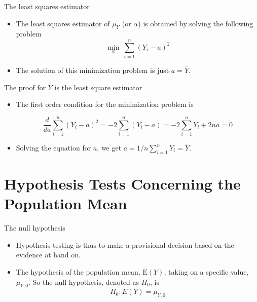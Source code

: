 \documentclass[presentation]{beamer}
\begin{document}
\begin{frame}[label={sec:org7d074b1}]{The least squares estimator}
\begin{itemize}
\item The least squares estimator of \(\mu_Y\) (or \(\alpha\)) is obtained by
solving the following problem
\[ \operatorname*{min}_a\: \sum_{i=1}^n (Y_i - a)^2 \]

\item The solution of this minimization problem is just \(a = \overline{Y}\).
\end{itemize}
\end{frame}

\begin{frame}[label={sec:org93bc69a}]{The proof for \(\overline{Y}\) is the least square estimator}
\begin{itemize}
\item The first order condition for the minimization problem is

\begin{equation*}
  \frac{d}{da}\sum_{i=1}^n (Y_i - a)^2 = -2\sum_{i=1}^n(Y_i - a) = -2\sum_{i=1}^n Y_i+ 2n a = 0      
\end{equation*}

\item Solving the equation for \(a\), we get \(a = 1/n\sum_{i=1}^n Y_i = \overline{Y}\).
\end{itemize}
\end{frame}


\section{Hypothesis Tests Concerning the Population Mean}
\label{sec:orgea55d7e}

\begin{frame}[label={sec:orge000b81}]{The null hypothesis}
\begin{itemize}
\item Hypothesis testing is thus to make a provisional
decision based on the evidence at hand on.

\item The hypothesis of the population mean, \(\mathrm{E}(Y)\), taking on a
specific value, \(\mu_{Y,0}\). So the null hypothesis, denoted as
\(H_0\), is 
 \[ H_0: E(Y) = \mu_{Y,0} \]
\end{itemize}
\end{frame}
\end{document}
